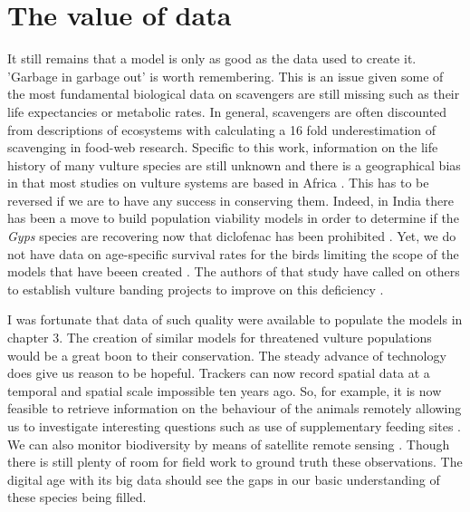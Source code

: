 \section{\uppercase{T}he value of data}
It still remains that a model is only as good as the data used to create it. 'Garbage in garbage out' is worth remembering. This is an issue given some of the most fundamental biological data on scavengers are still missing such as their life expectancies or metabolic rates. In general, scavengers are often discounted from descriptions of ecosystems \citep{devault2003scavenging} with \cite{wilson2011scavenging} calculating a 16 fold underestimation of scavenging in food-web research. Specific to this work, information on the life history of many vulture species are still unknown \citep{de2009database} and there is a geographical bias in that most studies on vulture systems are based in Africa \citep{moleon2014inter}. This has to be reversed if we are to have any success in conserving them. Indeed, in India there has been a move to build population viability models in order to determine if the \textit{Gyps} species are recovering now that diclofenac has been prohibited \citep{baral2013population}. Yet, we do not have data on age-specific survival rates for the birds limiting the scope of the models that have beeen created \citep{baral2013population}. The authors of that study have called on others to establish vulture banding projects to improve on this deficiency \citep{baral2013population}. 


I was fortunate that data of such quality were available to populate the models in chapter 3. The creation of similar models for threatened vulture populations would be a great boon to their conservation. The steady advance of technology does give us reason to be hopeful. Trackers can now record spatial data at a temporal and spatial scale impossible ten years ago. So, for example, it is now feasible to retrieve information on the behaviour of the animals remotely \citep{nathan2012using,tomkiewicz2010global} allowing us to investigate interesting questions such as use of supplementary feeding sites \citep{monsarrat2013predictability}. We can also monitor biodiversity by means of satellite remote sensing \citep{JPE:JPE12261}. Though there is still plenty of room for field work to ground truth these observations. The digital age with its big data should see the gaps in our basic understanding of these species being filled. 



